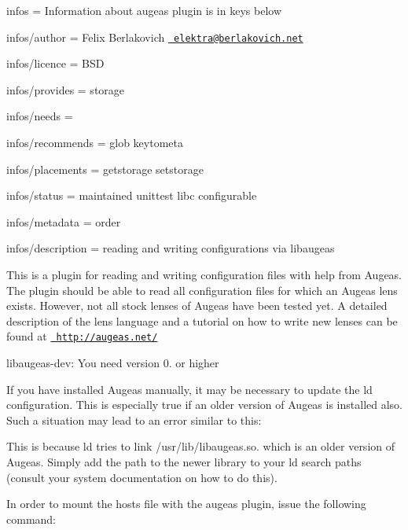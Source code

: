 
\begin{DoxyItemize}
\item infos = Information about augeas plugin is in keys below
\item infos/author = Felix Berlakovich \href{mailto:elektra@berlakovich.net}{\texttt{ elektra@berlakovich.\+net}}
\item infos/licence = B\+SD
\item infos/provides = storage
\item infos/needs =
\item infos/recommends = glob keytometa
\item infos/placements = getstorage setstorage
\item infos/status = maintained unittest libc configurable
\item infos/metadata = order
\item infos/description = reading and writing configurations via libaugeas
\end{DoxyItemize}

This is a plugin for reading and writing configuration files with help from Augeas. The plugin should be able to read all configuration files for which an Augeas lens exists. However, not all stock lenses of Augeas have been tested yet. A detailed description of the lens language and a tutorial on how to write new lenses can be found at \href{http://augeas.net/}{\texttt{ http\+://augeas.\+net/}}


\begin{DoxyItemize}
\item {\ttfamily libaugeas-\/dev}\+: You need version 0. or higher
\end{DoxyItemize}

If you have installed Augeas manually, it may be necessary to update the ld configuration. This is especially true if an older version of Augeas is installed also. Such a situation may lead to an error similar to this\+:


\begin{DoxyCode}{0}
\end{DoxyCode}


This is because {\ttfamily ld} tries to link {\ttfamily /usr/lib/libaugeas.so.} which is an older version of Augeas. Simply add the path to the newer library to your ld search paths (consult your system documentation on how to do this).

In order to mount the hosts file with the augeas plugin, issue the following command\+:


